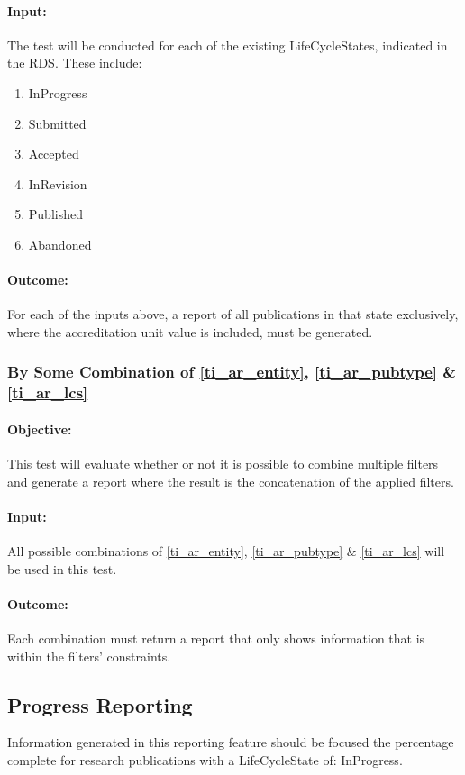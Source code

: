 \paragraph{Input:}
The test will be conducted for each of the existing LifeCycleStates, indicated in the RDS. These include:
\begin{enumerate}
	\item InProgress
	\item Submitted
	\item Accepted
	\item InRevision
	\item Published
	\item Abandoned
\end{enumerate}

\paragraph{Outcome:}
For each of the inputs above, a report of all publications in that state exclusively, where the accreditation unit value is included, must be generated.

\subsubsection{By Some Combination of \ref{ti_ar_entity}, \ref{ti_ar_pubtype} \& \ref{ti_ar_lcs}} \label{ti_ar_com}
\paragraph{Objective:}
This test will evaluate whether or not it is possible to combine multiple filters and generate a report where the result is the concatenation of the applied filters.
\paragraph{Input:}
All possible combinations of \ref{ti_ar_entity}, \ref{ti_ar_pubtype} \& \ref{ti_ar_lcs} will be used in this test.
\paragraph{Outcome:}
Each combination must return a report that only shows information that is within the filters' constraints.

\subsection{Progress Reporting}
Information generated in this reporting feature should be focused the percentage complete for research publications with a LifeCycleState of: InProgress.

